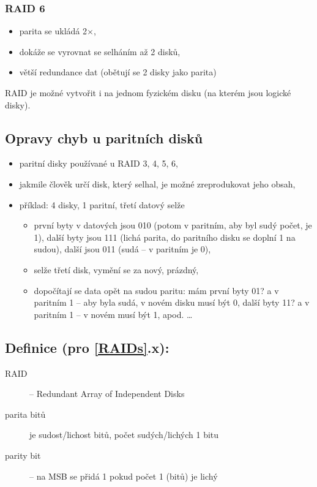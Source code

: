\documentclass[a4paper, 11pt]{article}
\begin{document}
\subsubsection{RAID 6}
\begin{itemize}
    \item parita se ukládá 2$\times$,
    \item dokáže se vyrovnat se selháním až 2 disků,
    \item větší redundance dat (obětují se 2 disky jako parita)
\end{itemize}
 
RAID je možné vytvořit i na jednom fyzickém disku (na kterém jsou logické disky).

\subsection{Opravy chyb u paritních disků}
\begin{itemize}
    \item paritní disky používané u RAID 3, 4, 5, 6,
    \item jakmile člověk určí disk, který selhal, je možné zreprodukovat jeho obsah,
    \item příklad: 4 disky, 1 paritní, třetí datový selže
    \begin{itemize}
        \item první byty v datových jsou 010 (potom v paritním, aby byl sudý počet, je 1), další byty jsou 111 (lichá parita, do paritního disku se doplní 1 na sudou), další jsou 011 (sudá -- v paritním je 0),
        \item selže třetí disk, vymění se za nový, prázdný,
        \item dopočítají se data opět na sudou paritu: mám první byty 01? a v paritním 1 -- aby byla sudá, v novém disku musí být 0, další byty 11? a v paritním 1 -- v novém musí být 1, apod. \ldots
    \end{itemize}
\end{itemize}
 
\subsection*{Definice (pro \ref{RAIDs}.x):}
\begin{description}
\item[RAID] -- Redundant Array of Independent Disks

\item[parita bitů] je sudost/lichost bitů, počet sudých/lichých 1 bitu

\item[parity bit] -- na MSB se přidá 1 pokud počet 1 (bitů) je lichý
\end{description}
 
\end{document}
